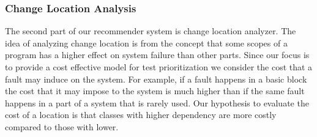 		
		
		
		
		
		
			



\subsubsection{Change Location Analysis}

The second part of our recommender system is
change location analyzer. 
The idea of analyzing change location
is from the concept that some scopes of a program has a higher effect on
system failure than other parts. Since our focus is to provide a cost 
effective model for test prioritization we consider the cost that a fault may induce 
on the system. For example, if a fault happens
in a basic block the cost that it may impose to the system is much higher than
if the same fault happens in a part of a system that is rarely used.
Our hypothesis to evaluate the cost of a location is that classes with higher dependency are more costly
compared to those with lower. 

